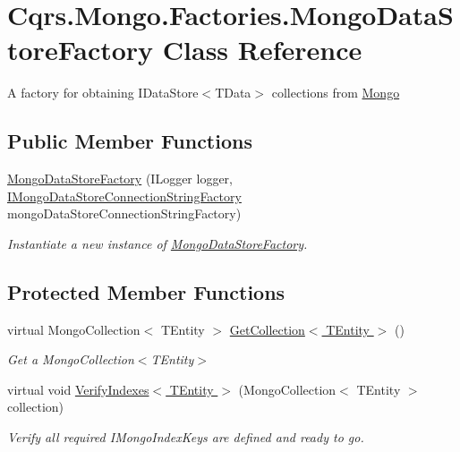 \hypertarget{classCqrs_1_1Mongo_1_1Factories_1_1MongoDataStoreFactory}{}\section{Cqrs.\+Mongo.\+Factories.\+Mongo\+Data\+Store\+Factory Class Reference}
\label{classCqrs_1_1Mongo_1_1Factories_1_1MongoDataStoreFactory}


A factory for obtaining I\+Data\+Store$<$\+T\+Data$>$ collections from \hyperlink{namespaceCqrs_1_1Mongo}{Mongo}  


\subsection*{Public Member Functions}
\begin{DoxyCompactItemize}
\item 
\hyperlink{classCqrs_1_1Mongo_1_1Factories_1_1MongoDataStoreFactory_a13e1957d50ef5ebb18723a3628a0ae5d_a13e1957d50ef5ebb18723a3628a0ae5d}{Mongo\+Data\+Store\+Factory} (I\+Logger logger, \hyperlink{interfaceCqrs_1_1Mongo_1_1Factories_1_1IMongoDataStoreConnectionStringFactory}{I\+Mongo\+Data\+Store\+Connection\+String\+Factory} mongo\+Data\+Store\+Connection\+String\+Factory)
\begin{DoxyCompactList}\small\item\em Instantiate a new instance of \hyperlink{classCqrs_1_1Mongo_1_1Factories_1_1MongoDataStoreFactory}{Mongo\+Data\+Store\+Factory}. \end{DoxyCompactList}\end{DoxyCompactItemize}
\subsection*{Protected Member Functions}
\begin{DoxyCompactItemize}
\item 
virtual Mongo\+Collection$<$ T\+Entity $>$ \hyperlink{classCqrs_1_1Mongo_1_1Factories_1_1MongoDataStoreFactory_a4785651135b3a214a855b4d1f7700836_a4785651135b3a214a855b4d1f7700836}{Get\+Collection$<$ T\+Entity $>$} ()
\begin{DoxyCompactList}\small\item\em Get a Mongo\+Collection$<$\+T\+Entity$>$ \end{DoxyCompactList}\item 
virtual void \hyperlink{classCqrs_1_1Mongo_1_1Factories_1_1MongoDataStoreFactory_af7db637db99701003e3d8f73a83a3485_af7db637db99701003e3d8f73a83a3485}{Verify\+Indexes$<$ T\+Entity $>$} (Mongo\+Collection$<$ T\+Entity $>$ collection)
\begin{DoxyCompactList}\small\item\em Verify all required I\+Mongo\+Index\+Keys are defined and ready to go. \end{DoxyCompactList}\end{DoxyCompactItemize}
